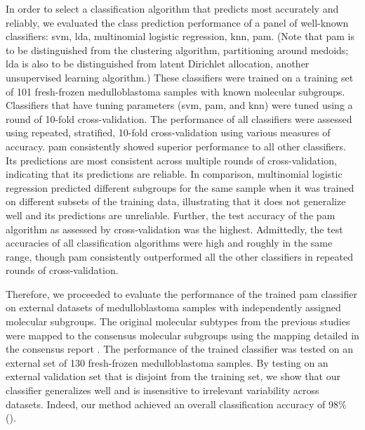 In order to select a classification algorithm that predicts most accurately and reliably, we evaluated the class prediction performance of a panel of well-known classifiers: \gls{svm}, \gls{lda}, multinomial logistic regression, \gls{knn}, \gls{pam}. (Note that \gls{pam} is to be distinguished from the clustering algorithm, partitioning around medoids; \gls{lda} is also to be distinguished from latent Dirichlet allocation, another unsupervised learning algorithm.) These classifiers were trained on a training set of 101 fresh-frozen medulloblastoma samples with known molecular subgroups. Classifiers that have tuning parameters (\gls{svm}, \gls{pam}, and \gls{knn}) were tuned using a round of 10-fold cross-validation. The performance of all classifiers were assessed using repeated, stratified, 10-fold cross-validation using various measures of accuracy. \gls{pam} consistently showed superior performance to all other classifiers. Its predictions are most consistent across multiple rounds of cross-validation, indicating that its predictions are reliable. In comparison, multinomial logistic regression predicted different subgroups for the same sample when it was trained on different subsets of the training data, illustrating that it does not generalize well and its predictions are unreliable. Further, the test accuracy of the \gls{pam} algorithm as assessed by cross-validation was the highest. Admittedly, the test accuracies of all classification algorithms were high and roughly in the same range, though \gls{pam} consistently outperformed all the other classifiers in repeated rounds of cross-validation.

Therefore, we proceeded to evaluate the performance of the trained \gls{pam} classifier on external datasets of medulloblastoma samples with independently assigned molecular subgroups. The original molecular subtypes from the previous studies were mapped to the consensus molecular subgroups using the mapping detailed in the consensus report . The performance of the trained classifier was tested on an external set of 130 fresh-frozen medulloblastoma samples. By testing on an external validation set that is disjoint from the training set, we show that our classifier generalizes well and is insensitive to irrelevant variability across datasets. Indeed, our method achieved an overall classification accuracy of 98\% ().

